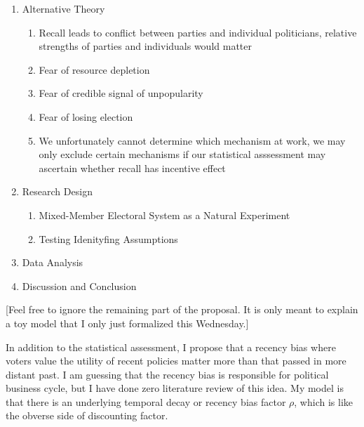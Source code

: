 \documentclass[hyphens, crop=false]{standalone}
\begin{document}
\begin{enumerate}
\begin{enumerate}
			\item 
			Recall makes policy more difficult to implement
			as recall could reduce the size of legislative party.
			\item 
			Without recall, parties could maintain their size through buying off voters with policy closer to the election
			\item 
			With recall, members of legislative parties are subject to swift retribution through recall.
		\end{enumerate}
		\item 
		Alternative Theory
		\begin{enumerate}
			\item 
			Recall leads to conflict between parties and individual politicians, relative strengths of parties and individuals would matter
			\item 
			Fear of resource depletion
			\item 
			Fear of credible signal of unpopularity
			\item 
			Fear of losing election
			\item 
			We unfortunately cannot determine which mechanism at work, we may only exclude certain mechanisms if our statistical asssessment may ascertain whether recall has incentive effect
		\end{enumerate}
		\item 
		Research Design
		\begin{enumerate}
			\item 
			Mixed-Member Electoral System as a Natural Experiment
			\item 
			Testing Idenityfing Assumptions
		\end{enumerate}
		\item 
		Data Analysis
		\item 
		Discussion and Conclusion
	\end{enumerate}
	
	
	
	
	[Feel free to ignore the remaining part of the proposal. It is only meant to explain a toy model that I only just formalized this Wednesday.]
	
	
	In addition to the statistical assessment,
	I propose that a recency bias where voters value the
	utility of recent policies matter more than that passed in more distant past.
	I am guessing that the recency bias is responsible for political business cycle,
	but I have done zero literature review of this idea.
	My model is that
	there is an underlying temporal decay or recency bias factor $\rho$,
	which is like the obverse side of discounting factor.
	
\end{document}
